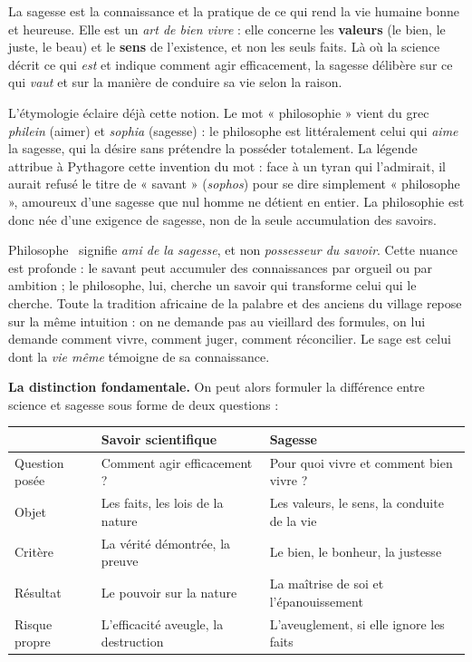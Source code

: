\documentclass[11pt]{article}
\newcommand{\cle}[1]{{\popxbold\color{popdark}#1}}
\begin{document}
\begin{definition}[La sagesse]
La \cle{sagesse} est la connaissance et la pratique de ce qui rend la vie humaine bonne et heureuse. Elle est un \emph{art de bien vivre} : elle concerne les \textbf{valeurs} (le bien, le juste, le beau) et le \textbf{sens} de l'existence, et non les seuls faits. Là où la science décrit ce qui \emph{est} et indique comment agir efficacement, la sagesse délibère sur ce qui \emph{vaut} et sur la manière de conduire sa vie selon la raison.
\end{definition}

L'étymologie éclaire déjà cette notion. Le mot « philosophie » vient du grec \emph{philein} (aimer) et \emph{sophia} (sagesse) : le philosophe est littéralement celui qui \emph{aime} la sagesse, qui la désire sans prétendre la posséder totalement. La légende attribue à Pythagore cette invention du mot : face à un tyran qui l'admirait, il aurait refusé le titre de « savant » (\emph{sophos}) pour se dire simplement « philosophe », amoureux d'une sagesse que nul homme ne détient en entier. La philosophie est donc née d'une exigence de sagesse, non de la seule accumulation des savoirs.

\begin{savaistu}
\guillemotleft Philosophe \guillemotright\ signifie \emph{ami de la sagesse}, et non \emph{possesseur du savoir}. Cette nuance est profonde : le savant peut accumuler des connaissances par orgueil ou par ambition ; le philosophe, lui, cherche un savoir qui transforme celui qui le cherche. Toute la tradition africaine de la palabre et des anciens du village repose sur la même intuition : on ne demande pas au vieillard des formules, on lui demande comment vivre, comment juger, comment réconcilier. Le sage est celui dont la \emph{vie même} témoigne de sa connaissance.
\end{savaistu}

\textbf{La distinction fondamentale.} On peut alors formuler la différence entre science et sagesse sous forme de deux questions :

\begin{center}
\begin{tabularx}{\linewidth}{|l|X|X|}
\hline
\rowcolor{popblueL} & \textbf{Savoir scientifique} & \textbf{Sagesse} \\
\hline
Question posée & Comment agir efficacement ? & Pour quoi vivre et comment bien vivre ? \\
\hline
Objet & Les faits, les lois de la nature & Les valeurs, le sens, la conduite de la vie \\
\hline
Critère & La vérité démontrée, la preuve & Le bien, le bonheur, la justesse \\
\hline
Résultat & Le pouvoir sur la nature & La maîtrise de soi et l'épanouissement \\
\hline
Risque propre & L'efficacité aveugle, la destruction & L'aveuglement, si elle ignore les faits \\
\hline
\end{tabularx}
\end{center}
\end{document}
